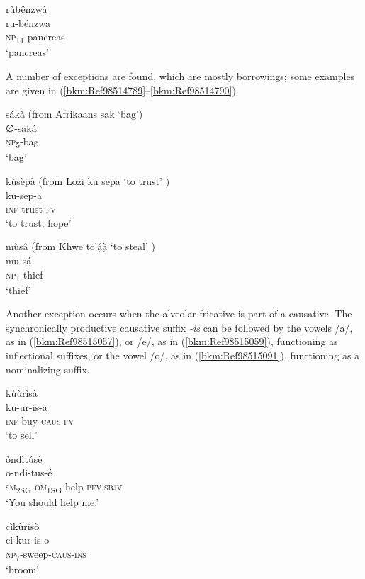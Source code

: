 \ea
\glll rùbênzwà\\
ru-bénzwa\\
\textsc{np}\textsubscript{11}-pancreas\\
\glt ‘pancreas’
\z

A number of exceptions are found, which are mostly borrowings; some examples are given in (\ref{bkm:Ref98514789}--\ref{bkm:Ref98514790}).

\ea
\label{bkm:Ref98514789}
sákà (from Afrikaans sak ‘bag’)\\
∅-saká\\
\textsc{np}\textsubscript{5}-bag\\
\glt ‘bag’
\z

\ea
kùsèpà (from Lozi ku sepa ‘to trust’ \citep{Burger1960})\\
ku-sep-a\\
\textsc{inf}-trust-\textsc{fv}\\
\glt ‘to trust, hope’
\z

\ea
\label{bkm:Ref98514790}
mùsâ (from Khwe tc’á̰à̰ ‘to steal’ \citep[355]{Kilian-Hatz2003})\\
mu-sá\\
\textsc{np}\textsubscript{1}-thief\\
\glt ‘thief’
\z

Another exception occurs when the alveolar fricative is part of a causative. The synchronically productive causa\-tive suffix \textit{-is} can be followed by the vowels /a/, as in (\ref{bkm:Ref98515057}), or /e/, as in (\ref{bkm:Ref98515059}), functioning as inflectional suffixes, or the vowel /o/, as in (\ref{bkm:Ref98515091}), functioning as a nominalizing suffix.

\ea
\label{bkm:Ref98515057}
\glll kùùrìsà\\
ku-ur-is-a\\
\textsc{inf}-buy-\textsc{caus}-\textsc{fv}\\
\glt ‘to sell’
\z

\ea
\label{bkm:Ref98515059}
\glll òndìtúsè\\
o-ndi-tus-é̲\\
\textsc{sm}\textsubscript{2SG}-\textsc{om}\textsubscript{1SG}-help-\textsc{pfv}.\textsc{sbjv}\\
\glt ‘You should help me.’
\z

\ea
\label{bkm:Ref98515091}
\glll cìkùrìsò\\
ci-kur-is-o\\
\textsc{np}\textsubscript{7}-sweep-\textsc{caus}-\textsc{ins}\\
\glt ‘broom’
\z

